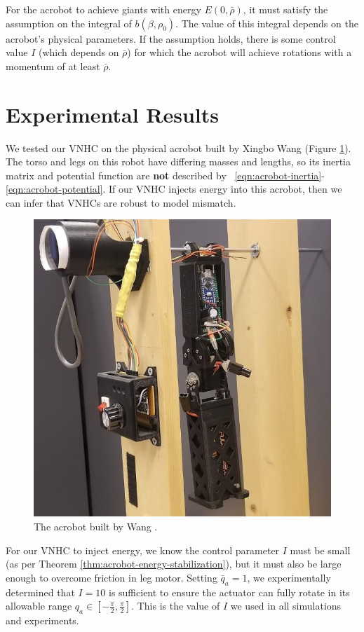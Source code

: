 \documentclass[journal,twoside,web]{ieeecolor}
\begin{document}
For the acrobot to achieve giants with energy
\(E(0,\bar{\rho})\), it must satisfy the assumption on the integral
of \(b(\beta,\rho_0)\). 
The value of this integral depends on the acrobot's physical parameters.
If the assumption holds, there is some control value \(I\)
(which depends on \(\bar{\rho}\)) for which the acrobot will 
achieve rotations with a momentum of at least \(\bar{\rho}\).

\section{Experimental Results}\label{sec:experiments}
We tested our VNHC on the physical acrobot built by
Xingbo Wang \cite{xingbo_thesis} (Figure \ref{fig:xingbo-acrobot}).
The torso and legs on this robot have differing masses and lengths, so
its inertia matrix and potential function are \textbf{not} described by 
~\eqref{eqn:acrobot-inertia}-\eqref{eqn:acrobot-potential}.
If our VNHC injects energy into this acrobot, then we can infer that
VNHCs are robust to model mismatch.

\begin{figure}
    \centering
    \includegraphics[width=0.6\linewidth]{xingbo_acrobot.jpg}
    \caption{The acrobot built by Wang \cite{xingbo_thesis}.}
    \label{fig:xingbo-acrobot}
\end{figure}

For our VNHC to inject energy, we know the control parameter \(I\) must be small
(as per Theorem \ref{thm:acrobot-energy-stabilization}), but it must also be
large enough to overcome friction in leg motor.
Setting \(\bar{q}_a = 1\), we experimentally determined that \(I = 10\) is
sufficient to ensure the actuator can fully rotate in its allowable range \(q_a
\in \left[ -\frac{\pi}{2}, \frac{\pi}{2}\right]\). 
This is the value of \(I\) we used in all simulations and experiments.
\end{document}
